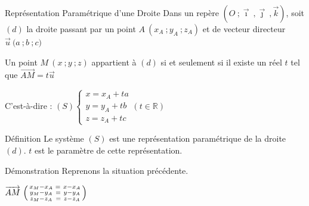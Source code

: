 \documentclass{coursbook}
\begin{document}
    
    \begin{Gpartie}{Représentation Paramétrique d'une Droite} 
        Dans un repère $\left(O~;\vec{\imath}~,\vec{\jmath}~,\vec{k}\right)$, soit $(d)$ la droite passant par un point $A~\left(x_A~;y_A~;z_A\right)$ et de vecteur directeur $\vec{u}~\big(a~;b~;c\big)$

        Un point $M~\left(x~;y~;z\right)$ appartient à $(d)$ si et seulement si il existe un réel $t$ tel que $\overrightarrow{AM}=t\vec{u}$

        C'est-à-dire : $(S)\begin{cases} x=x_A+ta \\ y=y_A+tb \\ z=z_A+tc \end{cases}\left(t\in\mathbb{R}\right)$

        \begin{Spartie}{Définition} 
            Le système $(S)$ est une représentation paramétrique de la droite $(d)$. $t$ est le paramètre de cette représentation.
            \begin{SSpartie}{Démonstration}
                Reprenons la situation précédente. 
                
                $\overrightarrow{AM}~\begin{psmallmatrix} x_M-x_A &=\ x-x_A \\ y_M-y_A &=\ y-y_A \\ z_M-z_A &=\ z-z_A \end{psmallmatrix}$


\end{SSpartie}
\end{Spartie}
\end{Gpartie}
\end{document}
